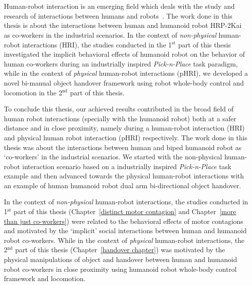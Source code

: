 {\color{blue}\chapter*{}}
\thispagestyle{empty}

Human-robot interaction is an emerging field which deals with the study and research of interactions between humans and robots~\cite{goodrich2008human}. The work done in this thesis is about the interactions between human and humanoid robot HRP-2Kai as co-workers in the industrial scenarios. In the context of \textit{non-physical} human-robot interactions (HRI), the studies conducted in the 1$^\text{st}$ part of this thesis investigated the implicit behavioral effects of humanoid robot on the behavior of human co-workers during an industrially inspired \textit{Pick-n-Place} task paradigm, while in the context of \textit{physical} human-robot interactions (pHRI), we developed a novel bi-manual object handover framework using robot whole-body control and locomotion in the 2$^\text{nd}$ part of this thesis.




To conclude this thesis, our achieved results contributed in the broad field of human robot interactions (specially with the humanoid robot) both at a safer distance and in close proximity, namely during a human-robot interaction (HRI) and physical human robot interaction (pHRI) respectively. The work done in this thesis was about the interactions between human and biped humanoid robot as `co-workers' in the industrial scenarios. We started with the non-physical human-robot interaction scenario based on a industrially inspired \textit{Pick-n-Place} task example and then advanced towards the physical human-robot interactions with an example of human humanoid robot dual arm bi-directional object handover.


In the context of \textit{non-physical} human-robot interactions, the studies conducted in 1$^\text{st}$ part of this thesis (Chapter~\ref{distinct motor contagion} and Chapter~\ref{more than just co-workers}) were related to the behavioral effects of motor contagions and motivated by the `implicit' social interactions between human and humanoid robot co-workers. While in the context of \textit{physical} human-robot interactions, the 2$^\text{nd}$ part of this thesis (Chapter~\ref{handover chapter}) was motivated by the physical manipulations of object and handover between human and humanoid robot co-workers in close proximity using humanoid robot whole-body control framework and locomotion.


